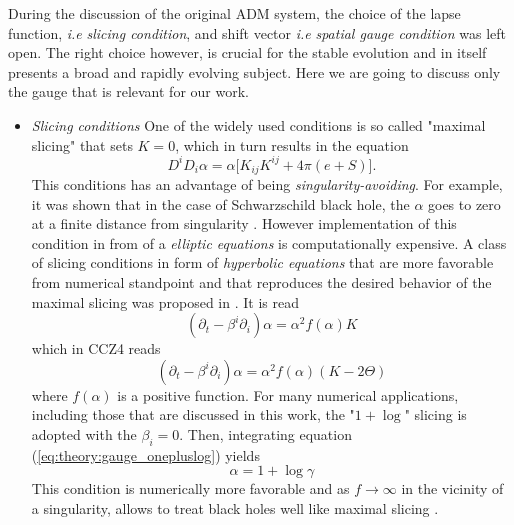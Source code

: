 {    
    During the discussion of the original ADM system, the choice of the lapse function, \textit{i.e} \textit{slicing condition}, and shift vector \textit{i.e} \textit{spatial gauge condition} was left open. 
    The right choice however, is crucial for the stable evolution and in itself presents a broad and rapidly evolving subject. Here we are going to discuss only the gauge that is relevant for our work. 
    
    \begin{itemize}
        \item \textit{Slicing conditions} 
        One of the widely used conditions is so called "maximal slicing" that sets $K=0$, which in turn results in the equation
        \begin{equation}
        D^{i}D_{i}\alpha = \alpha\big[K_{ij}K^{ij} + 4\pi(e+S)\big].
        \end{equation}
        This conditions has an advantage of being \textit{singularity-avoiding}. 
        For example, it was shown that in the case of Schwarzschild black hole, the $\alpha$ goes to zero at a finite distance from singularity \cite{Geyer:1995}. 
        However implementation of this condition in from of a \textit{elliptic equations} is computationally expensive.
        A class of slicing conditions in form of \textit{hyperbolic equations} that are more favorable from numerical standpoint and that reproduces the desired behavior of the maximal slicing was proposed in \cite{Bona:1994dr}. It is read 
        \begin{equation}
        (\partial_t - \beta^i\partial_i)\alpha = \alpha^2 f(\alpha)K
        \label{eq:theory:gauge_onepluslog}
        \end{equation}
        which in CCZ4 reads 
        \begin{equation}
        (\partial_t - \beta^i \partial_i )\alpha = \alpha^2 f(\alpha)(K-2\Theta)
        \end{equation}
        where $f(\alpha)$ is a positive function. 
        For many numerical applications, including those that are discussed in this work, the "$1 + \log$" slicing is adopted with the $\beta_i=0$. 
        Then, integrating equation (\ref{eq:theory:gauge_onepluslog}) yields 
        \begin{equation}
        \alpha = 1 + \log\gamma
        \end{equation}
        This condition is numerically more favorable and as $f\rightarrow\infty$ in the vicinity of a singularity, allows to treat black holes well like maximal slicing \cite{Baumgarte:2002jm}.
        

\end{itemize}}
